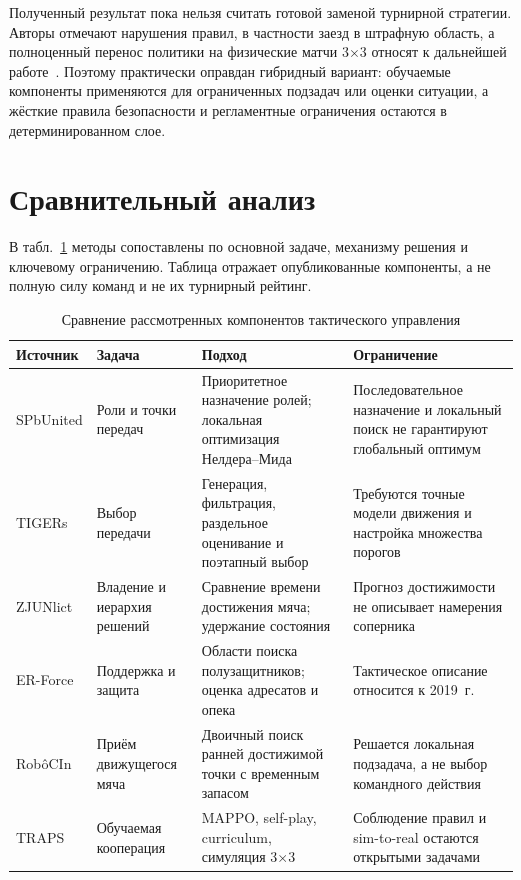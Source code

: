 \documentclass{misisarticle}
\begin{document}
Полученный результат пока нельзя считать готовой заменой турнирной стратегии. Авторы отмечают нарушения правил, в частности заезд в штрафную область, а полноценный перенос политики на физические матчи 3$\times$3 относят к дальнейшей работе~\cite{traps2026}. Поэтому практически оправдан гибридный вариант: обучаемые компоненты применяются для ограниченных подзадач или оценки ситуации, а жёсткие правила безопасности и регламентные ограничения остаются в детерминированном слое.

\section{Сравнительный анализ}

В табл.~\ref{tab:comparison} методы сопоставлены по основной задаче, механизму решения и ключевому ограничению. Таблица отражает опубликованные компоненты, а не полную силу команд и не их турнирный рейтинг.

\begin{table}[t]
  \caption{Сравнение рассмотренных компонентов тактического управления}
  \label{tab:comparison}
  \centering
  \small
  \begin{tabular}{@{}p{}p{}p{}p{}@{}}
    \toprule
    \textbf{Источник} & \textbf{Задача} & \textbf{Подход} & \textbf{Ограничение} \\
    \midrule
    SPbUnited & Роли и точки передач & Приоритетное назначение ролей; локальная оптимизация Нелдера--Мида & Последовательное назначение и локальный поиск не гарантируют глобальный оптимум \\
    TIGERs & Выбор передачи & Генерация, фильтрация, раздельное оценивание и поэтапный выбор & Требуются точные модели движения и настройка множества порогов \\
    ZJUNlict & Владение и иерархия решений & Сравнение времени достижения мяча; удержание состояния & Прогноз достижимости не описывает намерения соперника \\
    ER-Force & Поддержка и защита & Области поиска полузащитников; оценка адресатов и опека & Тактическое описание относится к 2019~г. \\
    RobôCIn & Приём движущегося мяча & Двоичный поиск ранней достижимой точки с временным запасом & Решается локальная подзадача, а не выбор командного действия \\
    TRAPS & Обучаемая кооперация & MAPPO, self-play, curriculum, симуляция 3$\times$3 & Соблюдение правил и sim-to-real остаются открытыми задачами \\
    \bottomrule
  \end{tabular}
\end{table}
\end{document}
